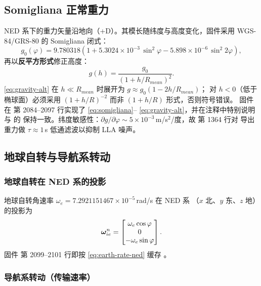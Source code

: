 \subsection{Somigliana 正常重力}

NED 系下的重力矢量沿地向（+D）。其模长随纬度与高度变化，固件采用
WGS-84/GRS-80 的 Somigliana 闭式：
\begin{equation}
  g_0(\varphi) = 9.780318\left(1 + 5.3024\times10^{-3}\,\sin^2\varphi
    - 5.898\times10^{-6}\,\sin^2 2\varphi\right),
  \label{eq:somigliana}
\end{equation}
再以\textbf{反平方形式}修正高度：
\begin{equation}
  g(h) = \frac{g_0}{\left(1 + h/R_{mean}\right)^2}.
  \label{eq:gravity-alt}
\end{equation}
\cref{eq:gravity-alt} 在 $h\ll R_{mean}$ 时展开为 $g \approx g_0(1 - 2h/R_{mean})$；
对 $h<0$（低于椭球面）必须采用 $(1+h/R)^{-2}$ 而非 $(1+h/R)$ 形式，否则符号错误。
固件在  第 2084--2097 行实现了 \cref{eq:somigliana}--
\cref{eq:gravity-alt}，并在注释中特别说明与  的
 保持一致。纬度敏感性：$\partial g/\partial\varphi
\sim 5\times10^{-3}$\,m/s$^2$/度，故  第 1364 行对
导出重力做 $\tau\approx1$\,s 低通滤波以抑制 LLA 噪声。

\subsection{地球自转与导航系转动}

\subsubsection{地球自转在 NED 系的投影}

地球自转角速率 $\omega_e = 7.2921151467\times10^{-5}$\,rad/s 在 NED 系
（$x$ 北、$y$ 东、$z$ 地）的投影为
\begin{equation}
  \boldsymbol{\omega}_{ie}^n = \begin{bmatrix}
    \omega_e\cos\varphi \\ 0 \\ -\omega_e\sin\varphi
  \end{bmatrix}.
  \label{eq:earth-rate-ned}
\end{equation}
固件  第 2099--2101 行即按 \cref{eq:earth-rate-ned}
缓存 。

\subsubsection{导航系转动（传输速率）}

